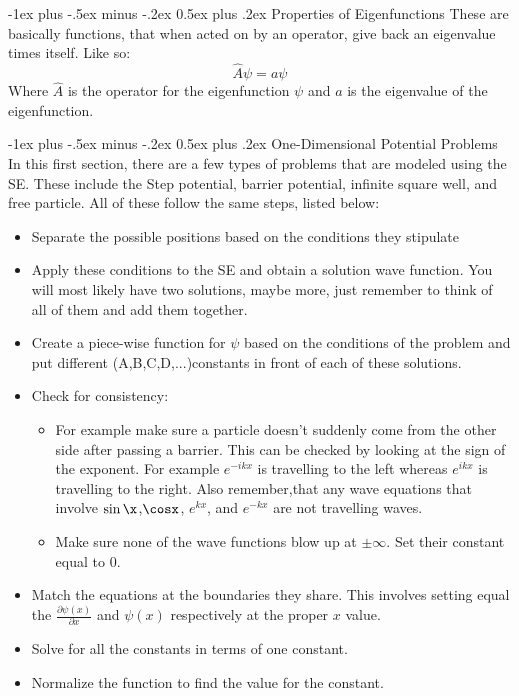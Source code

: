 \documentclass[10pt,landscape]{article}
\makeatletter
\renewcommand{\section}{\@startsection{section}{1}{0mm}%
                                {-1ex plus -.5ex minus -.2ex}%
                                {0.5ex plus .2ex}%
                                {\normalfont\large\bfseries}}
\makeatother
\begin{document}
\begin{multicols}{3}
\section{Properties of Eigenfunctions}
These are basically functions, that when acted on by an operator, give back an eigenvalue times itself. Like so:
\begin{equation*}
    \hat{A}\psi=a\psi
\end{equation*}
Where $\hat{A}$ is the operator for the eigenfunction $\psi$ and $a$ is the eigenvalue of the eigenfunction.

\section{One-Dimensional Potential Problems}
In this first section, there are a few types of problems that are modeled using the SE. These include the Step potential, barrier potential, infinite square well, and free particle. All of these follow the same steps, listed below:

\begin{itemize}
    \item Separate the possible positions based on the conditions they stipulate
    \item Apply these conditions to the SE and obtain a solution wave function. You will most likely have two solutions, maybe more, just remember to think of all of them and add them together. 
    \item Create a piece-wise function for $\psi$ based on the conditions of the problem and put different (A,B,C,D,...)constants in front of each of these solutions.
    \item Check for consistency:
    \begin{itemize}
        \item For example make sure a particle doesn't suddenly come from the other side after passing a barrier. This can be checked by looking at the sign of the exponent. For example $e^{-ikx}$ is travelling to the left whereas $e^{ikx}$ is travelling to the right. Also remember,that any wave equations that involve $\sin\x$,$\cosx$, $e^{kx}$, and $e^{-kx}$ are not travelling waves.
        \item Make sure none of the wave functions blow up at $\pm \infty$. Set their constant equal to $0$.
    \end{itemize}
    \item Match the equations at the boundaries they share. This involves setting equal the $\frac{\partial\psi(x)}{\partial x}$ and $\psi(x)$ respectively at the proper $x$ value. 
    \item Solve for all the constants in terms of one constant.
    \item Normalize the function to find the value for the constant.
    

\end{itemize}
\end{multicols}
\end{document}

